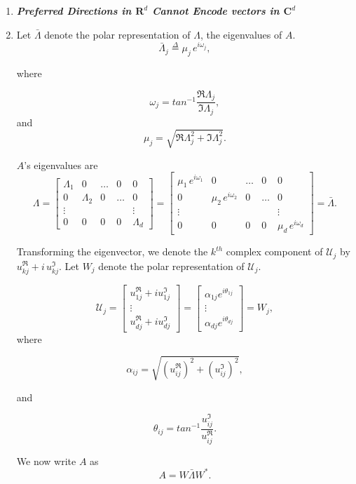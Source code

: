 \begin{enumerate}
\item\textbf{\textit{Preferred Directions in $\mathbf{R}^d$ Cannot Encode vectors in $\mathbf{C}^d$}}

\item Let $\bar{\Lambda}$ denote the polar representation of $\Lambda$, the eigenvalues of $A$. 
$$
\bar{\Lambda}_j
\overset{\Delta}{=}
\mu_j \, e^{i \omega_j},
$$

where 

$$
\omega_j = tan^{-1} \frac{\Re\Lambda_j}{\Im\Lambda_j}, 
$$
and
$$
\mu_j = \sqrt{\Re\Lambda_j^2 + \Im\Lambda_j^2}.
$$

$A$'s eigenvalues are
$$
\Lambda = 
\begin{bmatrix}
\Lambda_1 & 0 & \hdots &0  & 0
\\
0 & \Lambda_2 & 0 & \hdots & 0
\\
\vdots & & & & \vdots
\\
 0& 0  & 0 & 0 & \Lambda_d
 \end{bmatrix}
 = 
 \begin{bmatrix}
\mu_1 \, e^{i \omega_1} & 0 & \hdots &0  & 0
\\
0 & \mu_2 \, e^{i \omega_2} & 0 & \hdots & 0
\\
\vdots & & & & \vdots
\\
 0& 0  & 0 & 0 & \mu_d \, e^{i \omega_d}
 \end{bmatrix} = \bar{\Lambda}.
$$

Transforming the eigenvector, we denote the $k^{th}$ complex component of $\mathcal{U}_j$ by $u_{kj}^\Re + i \, u_{kj}^\Im$. Let $W_j$ denote the polar representation of $\mathcal{U}_j$.

$$
\mathcal{U}_j 
=
\begin{bmatrix}
u_{1j}^\Re + i u_{1j}^\Im
\\
\vdots
\\
u_{dj}^\Re + i u_{dj}^\Im
\end{bmatrix}
=
\begin{bmatrix}
\alpha_{1j} e^{i \theta_{1j}}
\\
\vdots
\\
\alpha_{dj} e^{i \theta_{dj}}
\end{bmatrix} = W_j,
$$
where

$$
\alpha_{ij} = \sqrt{(u_{ij}^\Re)^2 + (u_{ij}^\Im)^2},
$$

and

$$
\theta_{ij} = tan^{-1} \frac{u_{ij}^\Im}{u_{ij}^\Re}.
$$


We now write $A$ as 
$$
A = 
W \bar{\Lambda} W^*.
$$


\end{enumerate}
